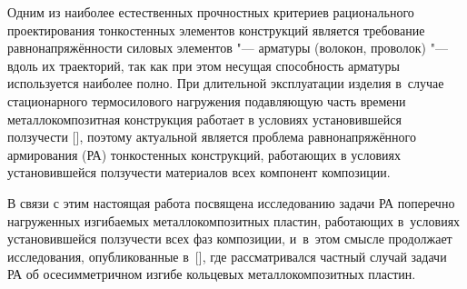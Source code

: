 



\date{31/I/2011} %




\maketitle

 Одним из наиболее естественных прочностных критериев рационального проектирования тонкостенных элементов
конструкций является требование равнонапряжённости силовых элементов "--- арматуры (волокон, проволок) "--- вдоль их траекторий,
так как при этом несущая способность арматуры используется наиболее полно.
При длительной эксплуатации изделия в~случае стационарного термосилового нагружения подавляющую часть времени металлокомпозитная конструкция работает в условиях установившейся ползучести [], поэтому актуальной является проблема равнонапряжённого армирования (РА) тонкостенных конструкций, работающих в условиях установившейся ползучести материалов всех компонент композиции.

В связи с этим настоящая работа посвящена исследованию задачи РА поперечно нагруженных изгибаемых металлокомпозитных пластин, работающих в~условиях установившейся ползучести всех фаз композиции, и~в~этом смысле продолжает исследования, опубликованные в~[], где рассматривался частный случай задачи РА об осесимметричном изгибе кольцевых металлокомпозитных пластин.

\smallskip

